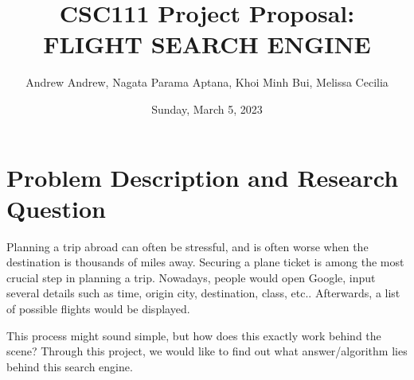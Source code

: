 \documentclass[11pt]{article}
\title{CSC111 Project Proposal: FLIGHT SEARCH ENGINE}
\author{Andrew Andrew, Nagata Parama Aptana, Khoi Minh Bui, Melissa Cecilia}
\date{Sunday, March 5, 2023}
\begin{document}
\maketitle

\section*{Problem Description and Research Question} 

\quad Planning a trip abroad can often be stressful, and is often worse when the destination is thousands of miles away. Securing a plane ticket is among the most crucial step in planning a trip. Nowadays, people would open Google, input several details such as time, origin city, destination, class, etc.. Afterwards, a list of possible flights would be displayed.

\quad This process might sound simple, but how does this exactly work behind the scene? Through this project, we would like to find out what answer/algorithm lies behind this search engine. 

\vspace{.3cm}


\end{document}
